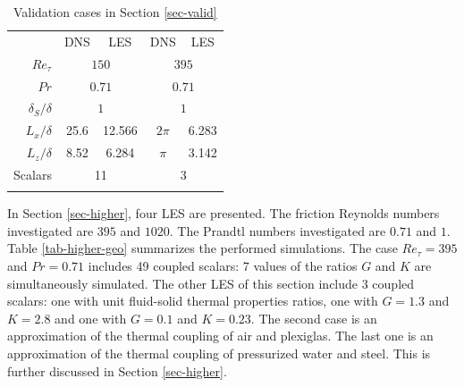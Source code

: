 \documentclass{svjour3}                     %
\begin{document}
\begin{table}
\caption{Validation cases in Section \ref{sec-valid}}
\label{tab-valid-geo}
\begin{tabular}{r|cc|cc|}%
 & DNS & LES & DNS & LES \\%
\noalign{\smallskip}\hline\noalign{\smallskip}
$Re_\tau$ &  \multicolumn{2}{|c|}{$150$} & \multicolumn{2}{|c|}{$395$} \\%
$Pr$ &  \multicolumn{2}{|c|}{$0.71$} & \multicolumn{2}{|c|}{$0.71$} \\%
${\delta_S}/{\delta}$ &  \multicolumn{2}{|c|}{$1$} & \multicolumn{2}{|c|}{$1$} \\%
${L_x}/{\delta}$ & 25.6 & 12.566 & $2\pi$ & 6.283 \\%
${L_z}/{\delta}$ & 8.52 & 6.284 & $\pi$ & 3.142 \\%
Scalars & \multicolumn{2}{|c|}{11} & \multicolumn{2}{|c|}{3} \\%
\noalign{\smallskip}\hline
\end{tabular}
\end{table}

In Section \ref{sec-higher}, four LES are presented.
The friction Reynolds numbers investigated are $395$ and $1020$.
The Prandtl numbers investigated are $0.71$ and $1$.
Table \ref{tab-higher-geo} summarizes the performed simulations.
The case ${Re_\tau=395}$ and ${Pr=0.71}$ includes 49 coupled scalars: 7 values of the ratios $G$ and $K$ are simultaneously simulated.
The other LES of this section include 3 coupled scalars: one with unit fluid-solid thermal properties ratios, one with ${G=1.3}$ and ${K=2.8}$ and one with ${G=0.1}$ and ${K=0.23}$.
The second case is an approximation of the thermal coupling of air and plexiglas.
The last one is an approximation of the thermal coupling of pressurized water and steel.
This is further discussed in Section \ref{sec-higher}.
\end{document}

